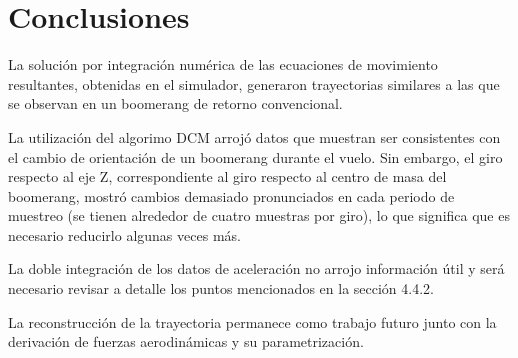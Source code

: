 \section{Conclusiones}

	La solución por integración numérica de las ecuaciones de movimiento resultantes, obtenidas en el simulador, generaron trayectorias similares a las que se observan en un boomerang de retorno convencional.

	La utilización del algorimo DCM arrojó datos que muestran ser consistentes con el cambio de orientación de un boomerang durante el vuelo. Sin embargo, el giro respecto al eje Z, correspondiente al giro respecto al centro de masa del boomerang, mostró cambios demasiado pronunciados en cada periodo de muestreo (se tienen alrededor de cuatro muestras por giro), lo que significa que es necesario reducirlo algunas veces más.

	La doble integración de los datos de aceleración no arrojo información útil y será necesario revisar a detalle los puntos mencionados en la sección 4.4.2.

	La reconstrucción de la trayectoria permanece como trabajo futuro junto con la derivación de fuerzas aerodinámicas y su parametrización.

